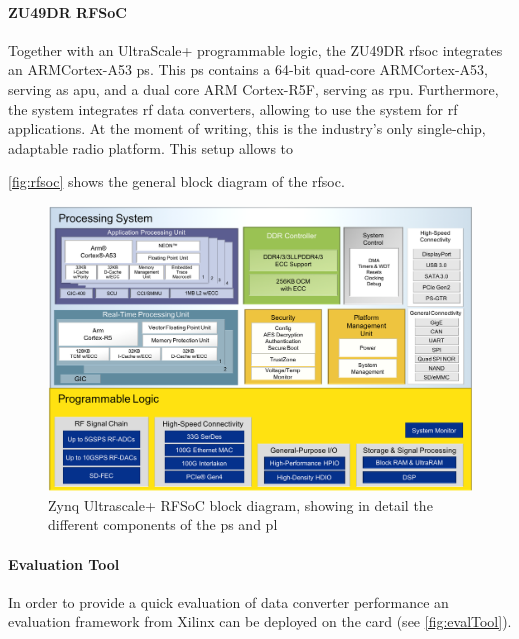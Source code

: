 \paragraph{ZU49DR RFSoC}
Together with an UltraScale+ programmable logic, the ZU49DR \gls{rfsoc} integrates an ARM\textregistered Cortex\texttrademark-A53 \gls{ps}. %
This \gls{ps} contains a 64-bit quad-core ARM\textregistered Cortex\texttrademark-A53, serving as \gls{apu}, and a dual core ARM Cortex-R5F, serving as \gls{rpu}.
Furthermore, the system integrates \gls{rf} data converters, allowing to use the system for \gls{rf} applications.
At the moment of writing, this is the industry's only single-chip, adaptable radio platform. \cite{zu49}
This setup allows to %

\autoref{fig:rfsoc} shows the general block diagram of the \gls{rfsoc}.

\begin{figure}[tbh]
	\centering
	\includegraphics[width = \textwidth]{chap/05-readout/img/rfsoc_blockdiagram}
	\caption[Zynq Ultrascale+ RFSoC block diagram]{Zynq Ultrascale+ RFSoC block diagram, showing in detail the different components of the \gls{ps} and \gls{pl}}
	\label{fig:rfsoc}
\end{figure}


\paragraph{Evaluation Tool}
In order to provide a quick evaluation of data converter performance an evaluation framework from Xilinx can be deployed on the card (see \autoref{fig:evalTool}). 

